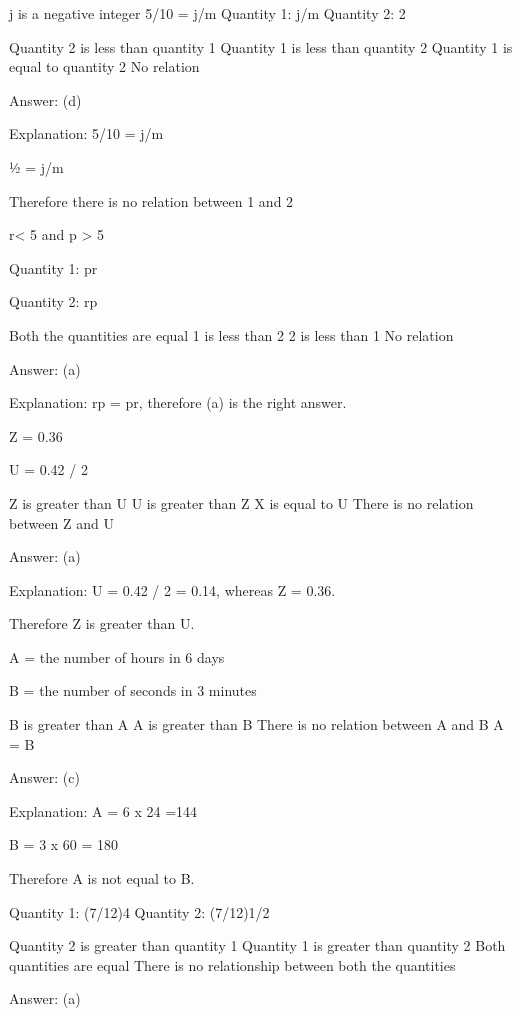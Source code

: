 


    j is a negative integer
    5/10 = j/m
    Quantity 1: j/m
    Quantity 2: 2

        Quantity 2 is less than quantity 1
        Quantity 1 is less than quantity 2
        Quantity 1 is equal to quantity 2
        No relation

    Answer: (d)

    Explanation: 5/10 = j/m

    ½ = j/m

    Therefore there is no relation between 1 and 2

    r< 5 and p > 5

    Quantity 1: pr

    Quantity 2: rp

        Both the quantities are equal
        1 is less than 2
        2 is less than 1
        No relation

    Answer: (a)

    Explanation: rp = pr, therefore (a) is the right answer.

    Z = 0.36

    U = 0.42 / 2

        Z is greater than U
        U is greater than Z
        X is equal to U
        There is no relation between Z and U

    Answer: (a)

    Explanation: U = 0.42 / 2 = 0.14, whereas Z = 0.36.

    Therefore Z is greater than U.

    A = the number of hours in 6 days

    B = the number of seconds in 3 minutes

        B is greater than A
        A is greater than B
        There is no relation between A and B
        A = B

    Answer: (c)

    Explanation: A = 6 x 24 =144

    B = 3 x 60 = 180

    Therefore A is not equal to B.

        Quantity 1: (7/12)4
    Quantity 2: (7/12)1/2

        Quantity 2 is greater than quantity 1
        Quantity 1 is greater than quantity 2
        Both quantities are equal
        There is no relationship between both the quantities

    Answer:  (a)

